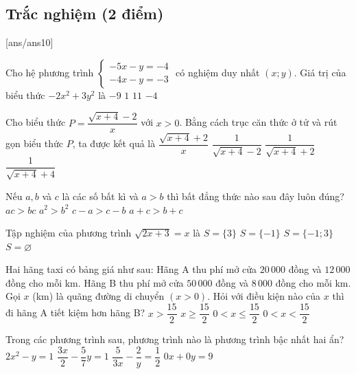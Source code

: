 \setcounter{ex}{0} 
\subsection{Trắc nghiệm (2 điểm)}
[ans/ans10] 


\begin{ex}
Cho hệ phương trình
$\begin{cases}
-5x-y=-4\\
-4x-y=-3
\end{cases}$
có nghiệm duy nhất $(x;y)$. Giá trị của biểu thức $-2x^2+3y^2$ là
\choice
{$-9$}
{\True $1$}
{$11$}
{$-4$}
\end{ex}

\begin{ex}
Cho biểu thức
$P=\dfrac{\sqrt{x+4}-2}{x}$ với $x>0$.
Bằng cách trục căn thức ở tử và rút gọn biểu thức $P$, ta được kết quả là
\vspace{0.25cm}
\choice
{$\dfrac{\sqrt{x+4}+2}{x}$}
{$\dfrac{1}{\sqrt{x+4}-2}$}
{\True $\dfrac{1}{\sqrt{x+4}+2}$}
{$\dfrac{1}{\sqrt{x+4}+4}$}
\end{ex}

\begin{ex}
Nếu $a,b$ và $c$ là các số bất kì và $a>b$ thì bất đẳng thức nào sau đây luôn đúng?
\choice
{$ac>bc$}
{$a^2>b^2$}
{$c-a>c-b$}
{\True $a+c>b+c$}
\end{ex}

\begin{ex}
Tập nghiệm của phương trình $\sqrt{2x+3}=x$ là
\choice
{\True $S=\{3\}$}
{$S=\{-1\}$}
{$S=\{-1;3\}$}
{$S=\varnothing$}
\end{ex}

\begin{ex}
Hai hãng taxi có bảng giá như sau:
Hãng A thu phí mở cửa $20\,000$ đồng và $12\,000$ đồng cho mỗi km.
Hãng B thu phí mở cửa $50\,000$ đồng và $8\,000$ đồng cho mỗi km.
Gọi $x$ (km) là quãng đường di chuyển $(x>0)$. Hỏi với điều kiện nào của $x$ thì đi hãng A tiết kiệm hơn hãng B?
\choice
{$x>\dfrac{15}{2}$}
{$x\ge\dfrac{15}{2}$}
{$0<x\le\dfrac{15}{2}$}
{\True $0<x<\dfrac{15}{2}$}
\end{ex}

\begin{ex}
Trong các phương trình sau, phương trình nào là phương trình bậc nhất hai ẩn?
\choice
{$2x^2-y=1$}
{\True $\dfrac{3x}{2}-\dfrac{5}{7}y=1$}
{$\dfrac{5}{3x}-\dfrac{2}{y}=\dfrac{1}{2}$}
{$0x+0y=9$}
\end{ex}


